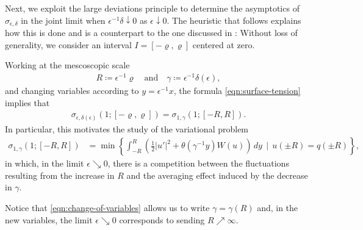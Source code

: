 \documentclass[12pt]{amsart}
\begin{document}
Next, we exploit the large deviations principle to determine the asymptotics of $\sigma_{\epsilon,\delta}$ in the joint limit when $\epsilon^{-1} \delta \downarrow 0$ as $\epsilon \downarrow 0$.  The heuristic that follows explains how this is done and is a counterpart to the one discussed in \cite[Sections 3.5 \& 4.3]{part1}: Without loss of generality, we consider an interval $I = [-\varrho,\varrho]$ centered at zero.

Working at the mescoscopic scale 
\begin{align}\label{eqn:change-of-variables}
	R \coloneqq \epsilon^{ -1 } \varrho
	\quad \text{and} \quad
	\gamma \coloneqq \epsilon^{ - 1 } \delta(\epsilon) ,
\end{align}
and changing variables according to $y = \epsilon^{-1} x$, the formula \eqref{eqn:surface-tension} implies that 
	\begin{align*}
			\sigma_{\epsilon,\delta(\epsilon)}(1; [-\varrho,\varrho] ) = \sigma_{1,\gamma}(1;[-R,R]) .
	\end{align*}
In particular, this motivates the study of the variational problem
	\begin{align*}
		\sigma_{1,\gamma}(1;[-R,R]) &= \min \left\{ \int_{-R}^{R} \left( \frac{1}{2} |u'|^{2} + \theta(\gamma^{-1} y) W(u) \right) \, dy \, \mid \, u(\pm R) = q(\pm R) \right\} ,
	\end{align*}
in which, in the limit $\epsilon \searrow 0$, there is a competition between the fluctuations resulting from the increase in $R$ and the averaging effect induced by the decrease in $\gamma$.

Notice that \eqref{eqn:change-of-variables} allows us to write $\gamma = \gamma(R)$ and, in the new variables, the limit $\epsilon \searrow 0$ corresponds to sending $R \nearrow \infty$.
	
\end{document}
